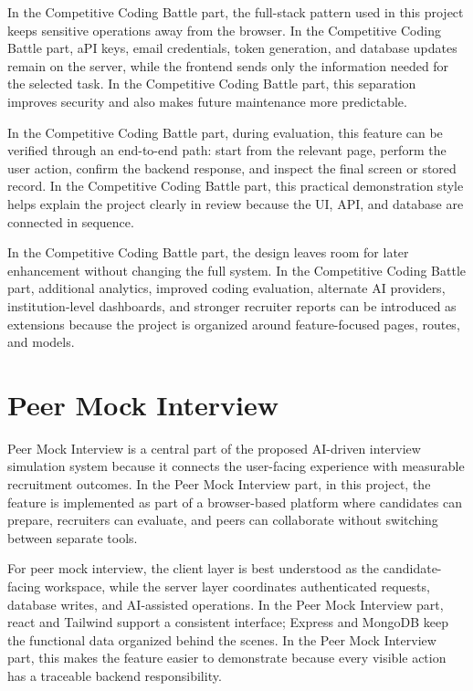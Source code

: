\documentclass[12pt,a4paper]{report}
\begin{document}
In the Competitive Coding Battle part, the full-stack pattern used in this project keeps sensitive operations away from the browser. In the Competitive Coding Battle part, aPI keys, email credentials, token generation, and database updates remain on the server, while the frontend sends only the information needed for the selected task. In the Competitive Coding Battle part, this separation improves security and also makes future maintenance more predictable.


In the Competitive Coding Battle part, during evaluation, this feature can be verified through an end-to-end path: start from the relevant page, perform the user action, confirm the backend response, and inspect the final screen or stored record. In the Competitive Coding Battle part, this practical demonstration style helps explain the project clearly in review because the UI, API, and database are connected in sequence.


In the Competitive Coding Battle part, the design leaves room for later enhancement without changing the full system. In the Competitive Coding Battle part, additional analytics, improved coding evaluation, alternate AI providers, institution-level dashboards, and stronger recruiter reports can be introduced as extensions because the project is organized around feature-focused pages, routes, and models.


\section{Peer Mock Interview}

Peer Mock Interview is a central part of the proposed AI-driven interview simulation system because it connects the user-facing experience with measurable recruitment outcomes. In the Peer Mock Interview part, in this project, the feature is implemented as part of a browser-based platform where candidates can prepare, recruiters can evaluate, and peers can collaborate without switching between separate tools.


For peer mock interview, the client layer is best understood as the candidate-facing workspace, while the server layer coordinates authenticated requests, database writes, and AI-assisted operations. In the Peer Mock Interview part, react and Tailwind support a consistent interface; Express and MongoDB keep the functional data organized behind the scenes. In the Peer Mock Interview part, this makes the feature easier to demonstrate because every visible action has a traceable backend responsibility.
\end{document}
